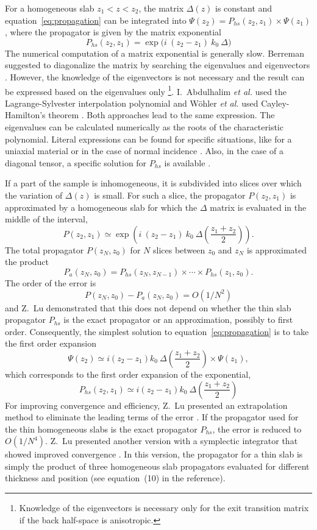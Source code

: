 For a homogeneous slab $z_1 < z < z_2$, the matrix $\Delta(z)$ is constant and equation~\ref{eq:propagation} can be integrated into $\Psi(z_2) = P_{hs}(z_2,z_1) \times  \Psi(z_1)$, where the propagator is given by the matrix exponential
$$
P_{hs}(z_2,z_1) = 
\exp\big(\displaystyle i\ (z_2-z_1)\ k_0\ \Delta\big)
$$
The numerical computation of a matrix exponential is generally slow.
Berreman suggested to diagonalize the matrix by searching the eigenvalues and eigenvectors \cite{Berreman}.
However, the knowledge of the eigenvectors is not necessary and the result can be expressed based on the eigenvalues only%
\footnote{Knowledge of the eigenvectors is necessary only for the exit transition matrix if the back half-space is anisotropic.}.
%
I.~Abdulhalim \emph{et al.} used the Lagrange-Sylvester interpolation polynomial \cite{1985_Abdulhalim, 1999_Abdulhalim, Gantmakher} and Wöhler \emph{et al.} used Cayley-Hamilton's theorem \cite{1988_Wohler, 1991_Wohler}. 
Both approaches lead to the same expression.
%
The eigenvalues can be calculated numerically as the roots of the characteristic polynomial.
Literal expressions can be found for specific situations, like for a uniaxial material \cite{1988_Wohler, 1991_Wohler} or in the case of normal incidence \cite{1985_Abdulhalim}.
Also, in the case of a diagonal tensor, a specific solution for $P_{hs}$ is available \cite{1999_Abdulhalim}.

If a part of the sample is inhomogeneous, it is subdivided into slices over which the variation of $\Delta(z)$ is small. 
For such a slice, the propagator $P(z_2,z_1)$ is approximated by a homogeneous slab for which the $\Delta$ matrix is evaluated in the middle of the interval,
$$
P(z_2,z_1) \simeq 
\exp\left(i\ (z_2-z_1)\ k_0\ \Delta\left(\frac{z_1+z_2}{2}\right)\right).
$$
The total propagator $P(z_N,z_0)$ for $N$ slices between $z_0$ and $z_N$ is approximated the product
$$P_a(z_N,z_0) = P_{hs}(z_N, z_{N-1})\times \cdots  \times P_{hs}(z_1,z_0).$$
The order of the error is
$$P(z_N,z_0)-P_a(z_N,z_0) = O(1/N^2)$$
and  Z.~Lu demonstrated \cite{2007_Lu} that this does not depend on whether the thin slab propagator $P_{hs}$ is the exact propagator or an approximation, possibly to first order.
Consequently, the simplest solution to equation~\ref{eq:propagation} is to take the first order expansion
$$
\Psi(z_2) \simeq 
i (z_2-z_1) k_0\ \Delta\left(\frac{z_1+z_2}{2}\right)\times \Psi(z_1),
$$
which corresponds to the first order expansion of the exponential,
$$
P_{hs}(z_2,z_1) \simeq i (z_2-z_1) k_0\ \Delta\left(\frac{z_1+z_2}{2}\right)
$$
For improving convergence and efficiency, Z.~Lu presented an extrapolation method to eliminate the leading terms of the error \cite{2007_Lu}.
If the propagator used for the thin homogeneous slabs is the exact propagator $P_{hs}$, the error is reduced to $O(1/N^4)$.
Z.~Lu presented another version with a symplectic integrator that showed improved convergence \cite{2010_Lu}.
In this version, the propagator for a thin slab is simply the product of three homogeneous slab propagators evaluated for different thickness and position (see equation~(10) in the reference).

